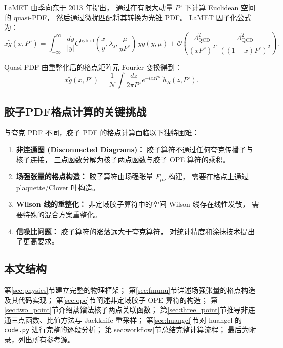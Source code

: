 \documentclass[12pt,a4paper]{ctexart}
\newcommand{\Pz}{P^{z}}
\newcommand{\QCD}{\Lambda_{\text{QCD}}}
\newcommand{\hR}{\tilde{h}_R}
\begin{document}
LaMET 由季向东于 2013 年提出\cite{lamet_original}，
通过在有限大动量 $P^{z}$ 下计算 Euclidean 空间的 quasi-PDF，
然后通过微扰匹配将其转换为光锥 PDF。
LaMET 因子化公式为\cite{gluon_pdf_derivation}：
\begin{equation}\label{eq:lamet_factorization}
x \tilde{g}(x, \Pz) = \int_{-\infty}^{\infty} \frac{dy}{|y|}
    C^{\text{hybrid}}\left(\frac{x}{y}, \lambda_s, \frac{\mu}{y\Pz}\right)
    \, y g(y, \mu) + \mathcal{O}\left(\frac{\QCD^{2}}{(x\Pz)^{2}},
    \frac{\QCD^{2}}{((1-x)\Pz)^{2}}\right).
\end{equation}

Quasi-PDF 由重整化后的格点矩阵元 Fourier 变换得到：
\begin{equation}\label{eq:quasi_pdf}
x \tilde{g}(x, \Pz) = \frac{1}{\mathcal{N}} \int \frac{dz}{2\pi\Pz}
    e^{-i x z \Pz} \, \hR(z, \Pz).
\end{equation}

\subsection{胶子PDF格点计算的关键挑战}

与夸克 PDF 不同，胶子 PDF 的格点计算面临以下独特困难：
\begin{enumerate}
    \item \textbf{非连通图 (Disconnected Diagrams)：}
        胶子算符不通过任何夸克传播子与核子连接，
        三点函数分解为核子两点函数与胶子 OPE 算符的乘积。

    \item \textbf{场强张量的格点构造：}
        胶子算符由场强张量 $F_{\mu\nu}$ 构建，
        需要在格点上通过 plaquette/Clover 叶构造。

    \item \textbf{Wilson 线的重整化：}
        非定域胶子算符中的空间 Wilson 线存在线性发散，
        需要特殊的混合方案重整化。

    \item \textbf{信噪比问题：}
        胶子算符的涨落远大于夸克算符，
        对统计精度和涂抹技术提出了更高要求。
\end{enumerate}

\subsection{本文结构}

第\ref{sec:physics}节建立完整的物理框架；
第\ref{sec:fmunu}节详述场强张量的格点构造及其代码实现；
第\ref{sec:ope}节阐述非定域胶子 OPE 算符的构造；
第\ref{sec:two_point}节介绍蒸馏法核子两点关联函数；
第\ref{sec:three_point}节推导非连通三点函数、比值方法与 Jackknife 重采样；
第\ref{sec:huangcl}节对 huangcl 的 \texttt{code.py} 进行完整的逐段分析；
第\ref{sec:workflow}节总结完整计算流程；
最后为附录，列出所有参考源。
\end{document}
